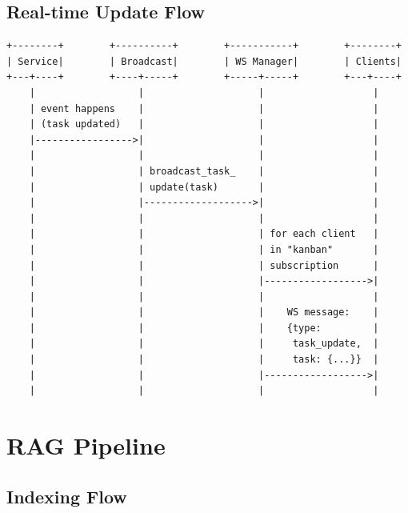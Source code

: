 \documentclass[11pt,a4paper]{article}
\begin{document}
\subsection{Real-time Update Flow}

\begin{verbatim}
+--------+        +----------+        +-----------+        +--------+
| Service|        | Broadcast|        | WS Manager|        | Clients|
+---+----+        +----+-----+        +-----+-----+        +---+----+
    |                  |                    |                   |
    | event happens    |                    |                   |
    | (task updated)   |                    |                   |
    |----------------->|                    |                   |
    |                  |                    |                   |
    |                  | broadcast_task_    |                   |
    |                  | update(task)       |                   |
    |                  |------------------->|                   |
    |                  |                    |                   |
    |                  |                    | for each client   |
    |                  |                    | in "kanban"       |
    |                  |                    | subscription      |
    |                  |                    |------------------>|
    |                  |                    |                   |
    |                  |                    |    WS message:    |
    |                  |                    |    {type:         |
    |                  |                    |     task_update,  |
    |                  |                    |     task: {...}}  |
    |                  |                    |------------------>|
    |                  |                    |                   |
\end{verbatim}

\section{RAG Pipeline}

\subsection{Indexing Flow}
\end{document}
